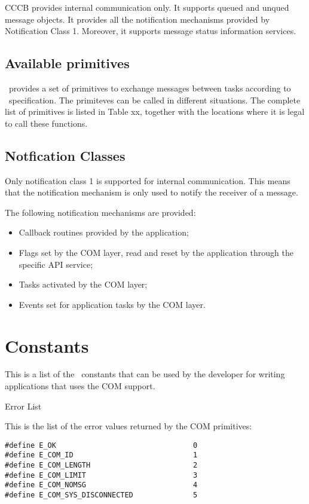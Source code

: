 CCCB provides internal communication only. It supports queued and unqued message 
objects. It provides all the notification mechanisms provided by Notification 
Class 1. Moreover, it supports message status information services.

\subsection{Available primitives}
\ee\ provides a set of primitives to exchange messages between tasks according to 
\oc\ specification. The primiteves can be called in different situations. 
The complete list of primitives is listed in Table xx, together with the 
locations where it is legal to call these functions.



\subsection{Notfication Classes}
Only notification class 1 is supported for internal communication. This means 
that the notification mechanism is only used to notify the receiver of a message.

The following notification mechanisms are provided:
\begin{itemize}
\item Callback routines provided by the application;
\item Flags set by the COM layer, read and reset by the application through 
the specific API service;
\item Tasks activated by the COM layer;
\item Events set for application tasks by the COM layer.
\end{itemize}


\pagebreak

\section{Constants}
\label{sec:constants}

This is a list of the \ee\ constants that can be used by the developer
for writing applications that uses the COM support.

\begin{constant}{Error List}
  \begin{constantdescription}
    This is the list of the error values returned by the COM primitives:
    \begin {lstlisting}
#define E_OK                                0
#define E_COM_ID                            1
#define E_COM_LENGTH                        2
#define E_COM_LIMIT                         3
#define E_COM_NOMSG                         4
#define E_COM_SYS_DISCONNECTED              5
    \end{lstlisting}
  \end{constantdescription}
\end{constant}


